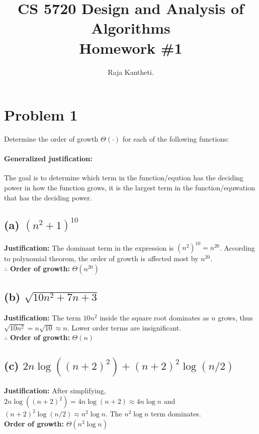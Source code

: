 \documentclass{article}
\begin{document}
\title{CS 5720 Design and Analysis of Algorithms \\ Homework \#1}
\author{Raja Kantheti. }
\maketitle

\section*{Problem 1}
Determine the order of growth \(\Theta(\cdot)\) for each of the following functions:

\paragraph{Generalized justification:}

The goal is to determine which term in the function/eqution has the deciding power in how the function grows, it is the largest term in the function/equwation that has the deciding power.

\subsection*{(a) \((n^2 + 1)^{10}\)}
\textbf{Justification:} The dominant term in the expression is \( (n^2)^{10} = n^{20} \). According to polynomial theorem, the order of growth is affected most by $n^{20}$.
\\ $\therefore$\textbf{ Order of growth:} \( \Theta(n^{20}) \)

\subsection*{(b) \(\sqrt{10n^2 + 7n + 3}\)}
\textbf{Justification:} The term \( 10n^2 \) inside the square root dominates as \( n \) grows, thus \( \sqrt{10n^2} = n \sqrt{10} \approx n \). Lower order terms are insignificant.
\\ $\therefore$\textbf{ Order of growth:} \( \Theta(n) \)

\subsection*{(c) \(2n \log((n+2)^2) + (n+2)^2 \log(n/2)\)}
\textbf{Justification:} After simplifying, \( 2n \log((n+2)^2) = 4n \log(n+2) \approx 4n \log n \) and \((n+2)^2 \log(n/2) \approx n^2 \log n \). The \( n^2 \log n \) term dominates.
\\ \textbf{Order of growth:} \( \Theta(n^2 \log n) \)
\end{document}
